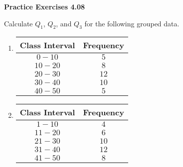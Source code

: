 \vspace{0.3ex}
\noindent\textbf{Practice Exercises 4.08}

\vspace{0.2ex}

Calculate \(Q_1\), \(Q_2\), and \(Q_3\) for the following grouped data.  
\begin{multicols}{2}
\begin{enumerate}
    \item 
    \begin{tabular}{|c|c|}
        \hline
        Class Interval & Frequency \\ \hline
        \(0 - 10\) & \(5\) \\ \hline
        \(10 - 20\) & \(8\) \\ \hline
        \(20 - 30\) & \(12\) \\ \hline
        \(30 - 40\) & \(10\) \\ \hline
        \(40 - 50\) & \(5\) \\ \hline
    \end{tabular}
    \item 
    \begin{tabular}{|c|c|}
        \hline
        Class Interval & Frequency \\ \hline
        \(1 - 10\) & \(4\) \\ \hline
        \(11 - 20\) & \(6\) \\ \hline
        \(21 - 30\) & \(10\) \\ \hline
        \(31 - 40\) & \(12\) \\ \hline
        \(41 - 50\) & \(8\) \\ \hline
    \end{tabular}
    \end{enumerate}
\end{multicols}
